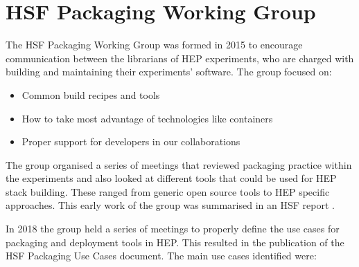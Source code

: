 \documentclass{webofc}
\begin{document}
\section{HSF Packaging Working Group}
\label{hsfpwg}

The HSF Packaging Working Group\cite{HSFPWG} was formed in 2015 to encourage communication
between the librarians of HEP experiments, who are charged with building and
maintaining their experiments' software. The group focused on:

\begin{itemize}
    \item Common build recipes and tools
    \item How to take most advantage of technologies like containers
    \item Proper support for developers in our collaborations
\end{itemize}

The group organised a series of meetings that reviewed packaging
practice within the experiments and also looked at different tools that
could be used for HEP stack building. These ranged from generic open 
source tools to HEP specific approaches. This early work of the group
was summarised in an HSF report \cite{l_sexton_kennedy_2016_1472340}.

In 2018 the group held a series of meetings to properly define
the use cases for packaging and deployment tools in HEP. This resulted
in the publication of the HSF Packaging Use Cases document\cite{graeme_a_stewart_2020_3634722}.
The main use cases identified were:
\end{document}

